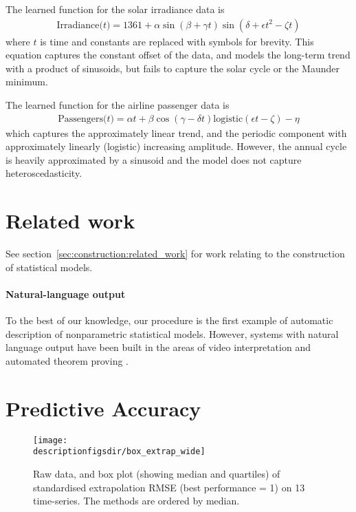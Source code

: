 The learned function for the solar irradiance data is
\begin{align*}
\textrm{Irradiance($t$)} = 1361 + \alpha\sin(\beta + \gamma t)\sin(\delta + \epsilon t^2 - \zeta t)
\end{align*}
where $t$ is time and constants are replaced with symbols for brevity.
This equation captures the constant offset of the data, and models the long-term trend with a product of sinusoids, but fails to capture the solar cycle or the Maunder minimum.

The learned function for the airline passenger data is
\begin{align*}
\textrm{Passengers($t$)} = \alpha t + \beta\cos(\gamma - \delta t)\textrm{logistic}(\epsilon t - \zeta) - \eta
\end{align*}
which captures the approximately linear trend, and the periodic component with approximately linearly (logistic) increasing amplitude.
However, the annual cycle is heavily approximated by a sinusoid and the model does not capture heteroscedasticity.

\section{Related work}
\label{sec:related-work}

See section~\ref{sec:construction:related_work} for work relating to the construction of statistical models.

\paragraph{Natural-language output}
To the best of our knowledge, our procedure is the first example of automatic description of nonparametric statistical models.
However, systems with natural language output have been built in the areas of video interpretation \citep{Barbu2012-wv} and automated theorem proving \citep{Ganesalingam_undated-us}.


\section{Predictive Accuracy}
\label{sec:numerical}

\begin{figure*}[ht]
\centering
\texttt{[image: \\descriptionfigsdir/box\_extrap\_wide]}
\vspace{-0.8cm}
\caption{
Raw data, and box plot (showing median and quartiles) of standardised extrapolation RMSE (best performance = 1) on 13 time-series.
The methods are ordered by median.
}
\label{fig:box_extrap_dist}
\end{figure*}

